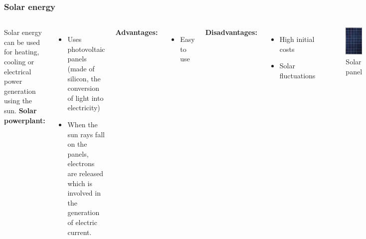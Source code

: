 \documentclass[usepdftitle=true]{beamer}
\begin{document}
\begin{frame}
	\frametitle{Solar energy}
	\begin{columns}
			Solar energy can be used for heating, cooling or electrical power generation using the sun.
			\textbf{Solar powerplant:}
			\begin{itemize}
				\item Uses photovoltaic panels (made of silicon, the conversion of light into electricity)
				\item When the sun rays fall on the panels, electrons are released which is involved in the generation of electric current.
			\end{itemize}
			\textbf{Advantages:}
			\begin{itemize}
				\item Easy to use 
			\end{itemize}
			\textbf{Disadvantages:}
			\begin{itemize}
				\item High initial costs
				\item Solar fluctuations
			\end{itemize}
			\begin{figure}
				\includegraphics[scale=0.40]{img/solar_panel_flat.jpg}
				\caption{Solar panel}
			\end{figure}
	\end{columns}
\end{frame}
\end{document}
